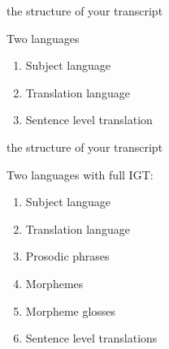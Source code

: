 \documentclass{beamer}
\begin{document}
     \begin{frame}{the structure of your transcript}
     \begin{description}
       \item<1->[Example 3:] Two languages
         \begin{enumerate}
           \item<2-> Subject language
           \item<2-> Translation language
           \item<2-> Sentence level translation
         \end{enumerate}
     \end{description}
    \end{frame}
    
    \begin{frame}{the structure of your transcript}
      \begin{description}
      \item<1->[Example 4:] Two languages with full IGT:
        \begin{enumerate}
          \item<2-> Subject language
          \item<2-> Translation language
          \item<2-> Prosodic phrases
          \item<2-> Morphemes
          \item<2-> Morpheme glosses
          \item<2-> Sentence level translations
        \end{enumerate}
      \end{description}
    \end{frame}
    
\end{document}
